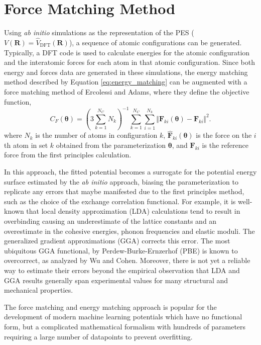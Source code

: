 \section{Force Matching Method}
Using \emph{ab initio} simulations as the representation of the PES ($V(\bm{R})=\hat{V}_{\text{DFT}}(\bm{R})$), a sequence of atomic configurations can be generated.  Typically, a DFT code is used to calculate energies for the atomic configuration and the interatomic forces for each atom in that atomic configuration. Since both energy and forces data are generated in these simulations, the energy matching method described by Equation \ref{eq:energy_matching} can be augmented with a force matching method of Ercolessi and Adams\cite{ercolessi1994_fitting_forcematching}, where they define the objective function,
\begin{equation}
\label{eq:force_matching}
	C_{F}(\bm{\theta}) = \left(3\sum_{k=1}^{N_C} N_k \right)^{-1}
		\sum_{k=1}^{N_C}\sum_{i=1}^{N_k}
			\Vert \hat{\bm{F}}_{ki}(\bm{\theta}) - \bm{F}_{ki}\Vert^2.
\end{equation}
where $N_k$ is the number of atoms in configuration $k$, $\hat{\bm{F}}_{ki}(\bm{\theta})$ is the force on the $i$th atom in set $k$ obtained from the parameterization $\bm{\theta}$, and $\bm{F}_{ki}$ is the reference force from the first principles calculation.

In this approach, the fitted potential becomes a surrogate for the potential energy surface estimated by the \emph{ab initio} approach, biasing the parameterization to replicate any errors that maybe manifested due to the first principles method, such as the choice of the exchange correlation functional.  For example, it is well-known that local density approximation (LDA)\cite{kohn1965_dft} calculations tend to result in overbinding causing an underestimate of the lattice constants and an overestimate in the cohesive energies, phonon frequencies and elastic moduli\cite{vandewalle1999_lda_overbinding}.  The generalized gradient approximations (GGA) corrects this error.  The most ubiquitous GGA functional, by Perdew-Burke-Ernzerhof (PBE)\cite{perdew1996_gga_pbe} is known to overcorrect, as analyzed by Wu and Cohen\cite{wu2006_gga_underbinding}.  Moreover, there is not yet a reliable way to estimate their errors beyond the empirical observation that LDA and GGA results generally span experimental values for many structural and mechanical properties.

The force matching and energy matching approach is popular for the development of modern machine learning potentials which have no functional form, but a complicated mathematical formalism with hundreds of parameters\cite{behler2016_ml_pot} requiring a large number of datapoints to prevent overfitting\cite{wood2018_snap}.

